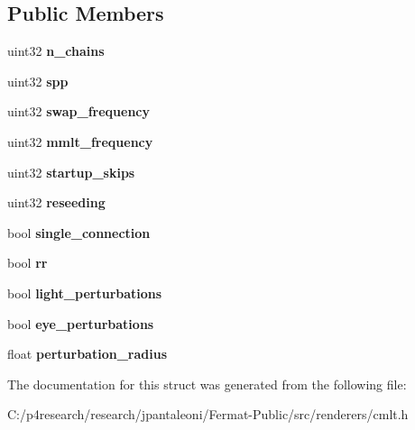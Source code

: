 \subsection*{Public Members}
\begin{DoxyCompactItemize}
\item 
\mbox{\label{struct_c_m_l_t_options_a245af891fe4ed10db7d0da618ac0c5dd}} 
uint32 {\bfseries n\+\_\+chains}
\item 
\mbox{\label{struct_c_m_l_t_options_a2ec9a22abd01659176b885a573f6557d}} 
uint32 {\bfseries spp}
\item 
\mbox{\label{struct_c_m_l_t_options_a2cf42a00a147b2f4edc9a6411e9ce63e}} 
uint32 {\bfseries swap\+\_\+frequency}
\item 
\mbox{\label{struct_c_m_l_t_options_aea5290e75c703e2acb711cde0f6eff67}} 
uint32 {\bfseries mmlt\+\_\+frequency}
\item 
\mbox{\label{struct_c_m_l_t_options_ab45c9e49e578b63b01df9f932da06665}} 
uint32 {\bfseries startup\+\_\+skips}
\item 
\mbox{\label{struct_c_m_l_t_options_adcef80ec72c5d8274fd537047b815ee5}} 
uint32 {\bfseries reseeding}
\item 
\mbox{\label{struct_c_m_l_t_options_a8c11a5d5ab22bb7e836bb44376387bef}} 
bool {\bfseries single\+\_\+connection}
\item 
\mbox{\label{struct_c_m_l_t_options_a1893a46925e922975cf4128caf1548a7}} 
bool {\bfseries rr}
\item 
\mbox{\label{struct_c_m_l_t_options_a2eead74be1feb4cea1946dd75cff8df1}} 
bool {\bfseries light\+\_\+perturbations}
\item 
\mbox{\label{struct_c_m_l_t_options_acc0220b53f1d1bc9b8789be4dc4bc186}} 
bool {\bfseries eye\+\_\+perturbations}
\item 
\mbox{\label{struct_c_m_l_t_options_af9c4c7ae7563a2f5a96d13874b55002b}} 
float {\bfseries perturbation\+\_\+radius}
\end{DoxyCompactItemize}


The documentation for this struct was generated from the following file\+:\begin{DoxyCompactItemize}
\item 
C\+:/p4research/research/jpantaleoni/\+Fermat-\/\+Public/src/renderers/cmlt.\+h\end{DoxyCompactItemize}
